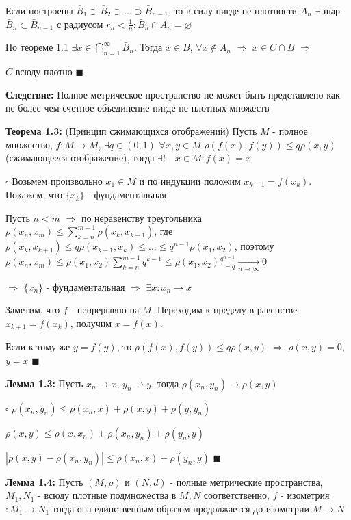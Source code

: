 \documentclass[a4paper]{report}
\begin{document}
Если построены $\bar B_1\supset\bar B_2\supset\ldots\supset\bar B_{n-1}$, то в силу нигде не плотности $A_n$ $\exists$ 
шар $\bar B_n\subset\bar B_{n-1}$ с радиусом $r_n<\frac1n\colon\bar B_n\cap A_n=\varnothing$

По теореме 1.1 $\exists x\in\bigcap\limits_{n=1}^\infty\bar B_n$. Тогда $x\in B$, $\forall x\notin A_n$ $\Rightarrow$ 
$x\in C\cap B$ $\Rightarrow$ 

$C$ всюду плотно $\blacksquare$
\bigskip

\noindent\textbf{Следствие:} Полное метрическое пространство не может быть представлено как не более чем счетное объединение 
нигде не плотных множеств
\bigskip

\noindent\textbf{Теорема 1.3:} (Принцип сжимающихся отображений) Пусть $M$ - полное множество, $f\colon M\to M$, 
$\exists q\in(0,1)$ $\forall x,y\in M$ $\rho\left(f(x),f(y)\right)\le q\rho(x,y)$ (сжимающееся отображение), тогда 
$\exists!\quad x\in M\colon f(x)=x$

\noindent $\square$ Возьмем произвольно $x_1\in M$ и по индукции положим $x_{k+1}=f(x_k)$. Покажем, что $\{x_k\}$ - 
фундаментальная

Пусть $n<m$ $\Rightarrow$ по неравенству треугольника $\rho(x_n,x_m)\le\sum\limits_{k=n}^{m-1}\rho(x_k,x_{k+1})$, 
где $\rho(x_k,x_{k+1})\le q\rho(x_{k-1},x_k)\le\ldots\le q^{n-1}\rho(x_1,x_2)$, поэтому $\rho(x_n,x_m)\le\rho(x_1,x_2)
\sum\limits_{k=n}^{m-1}q^{k-1}\le\rho(x_1,x_2)\displaystyle\frac{q^{n-1}}{1-q}\xrightarrow[n\to\infty]{}0$

$\Rightarrow$ $\{x_n\}$ - фундаментальная $\Rightarrow$ $\exists x\colon x_n\to x$

Заметим, что $f$ - непрерывно на $M$. Переходим к пределу в равенстве $x_{k+1}=f(x_k)$, получим $x=f(x)$. 

\noindent Если к тому же 
$y=f(y)$, то $\rho(f(x),f(y))\le q\rho(x,y)$ $\Rightarrow$ $\rho(x,y)=0$, $y=x$ $\blacksquare$
\bigskip

\noindent\textbf{Лемма 1.3:} Пусть $x_n\to x$, $y_n\to y$, тогда $\rho(x_n,y_n)\to\rho(x,y)$

\noindent $\square$ $\rho(x_n,y_n)\le\rho(x_n,x)+\rho(x,y)+\rho(y,y_n)$

$\rho(x,y)\le\rho(x,x_n)+\rho(x_n,y_n)+\rho(y_n,y)$

$|\rho(x,y)-\rho(x_n,y_n)|\le\rho(x_n,x)+\rho(y_n,y)$ $\blacksquare$
\bigskip

\noindent\textbf{Лемма 1.4:} Пусть $(M,\rho)$ и $(N,d)$ - полные метрические пространства, $M_1,N_1$ - всюду плотные 
подмножества в $M,N$ соответственно, $f$ - изометрия $\colon M_1\to N_1$ тогда она единственным образом продолжается до 
изометрии $M\to N$
\end{document}
